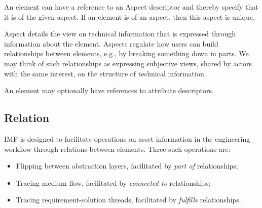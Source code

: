 \documentclass[../main.tex]{subfiles}
\begin{document}

An element can have a reference to an Aspect descriptor and thereby specify that it is of the given aspect. If an element is of an aspect, then this aspect is unique. 

Aspect details the view on technical information that is expressed through information about the element. Aspects regulate how users can build relationships between elements, e.g., by breaking something down in parts. We may think of such relationships as expressing subjective views,  shared by actors with the same interest, on the structure of technical information. 

An element may optionally have references to attribute descriptors.

\subsection{Relation}
\label{sec:Relations}
IMF is designed to facilitate operations on asset information in the engineering workflow through relations between elements. Three such operations are:
\begin{itemize}
     \item Flipping between abstraction layers,   facilitated by \textit{part of} relationships;
     \item Tracing medium flow, facilitated by  \textit{connected to}  relationships;
     \item Tracing requirement-solution threads, facilitated by \textit{fulfills}  relationships.
 \end{itemize}

 
\end{document}
